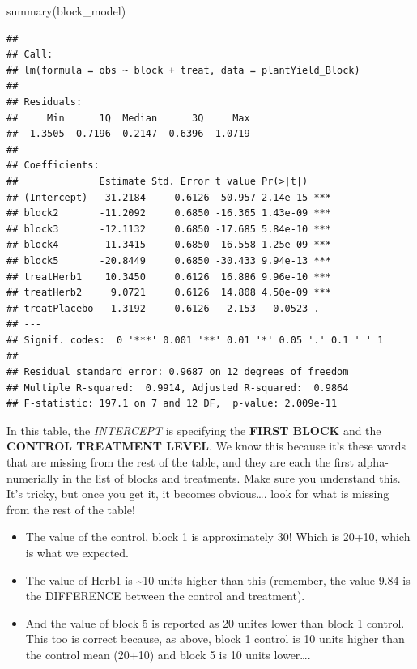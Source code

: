 \documentclass[
]{book}
\newenvironment{Shaded}{\begin{snugshade}}{\end{snugshade}}
\newcommand{\FunctionTok}[1]{\textcolor[rgb]{0.00,0.00,0.00}{#1}}
\newcommand{\NormalTok}[1]{#1}
\providecommand{\tightlist}{%
  \setlength{\itemsep}{0pt}\setlength{\parskip}{0pt}}
\begin{document}
\begin{Shaded}
\begin{Highlighting}[]
\FunctionTok{summary}\NormalTok{(block\_model)}
\end{Highlighting}
\end{Shaded}

\begin{verbatim}
## 
## Call:
## lm(formula = obs ~ block + treat, data = plantYield_Block)
## 
## Residuals:
##     Min      1Q  Median      3Q     Max 
## -1.3505 -0.7196  0.2147  0.6396  1.0719 
## 
## Coefficients:
##              Estimate Std. Error t value Pr(>|t|)    
## (Intercept)   31.2184     0.6126  50.957 2.14e-15 ***
## block2       -11.2092     0.6850 -16.365 1.43e-09 ***
## block3       -12.1132     0.6850 -17.685 5.84e-10 ***
## block4       -11.3415     0.6850 -16.558 1.25e-09 ***
## block5       -20.8449     0.6850 -30.433 9.94e-13 ***
## treatHerb1    10.3450     0.6126  16.886 9.96e-10 ***
## treatHerb2     9.0721     0.6126  14.808 4.50e-09 ***
## treatPlacebo   1.3192     0.6126   2.153   0.0523 .  
## ---
## Signif. codes:  0 '***' 0.001 '**' 0.01 '*' 0.05 '.' 0.1 ' ' 1
## 
## Residual standard error: 0.9687 on 12 degrees of freedom
## Multiple R-squared:  0.9914, Adjusted R-squared:  0.9864 
## F-statistic: 197.1 on 7 and 12 DF,  p-value: 2.009e-11
\end{verbatim}

In this table, the \emph{INTERCEPT} is specifying the \textbf{FIRST BLOCK} and the \textbf{CONTROL TREATMENT LEVEL}. We know this because it's these words that are missing from the rest of the table, and they are each the first alpha-numerially in the list of blocks and treatments. Make sure you understand this. It's tricky, but once you get it, it becomes obvious\ldots. look for what is missing from the rest of the table!

\begin{itemize}
\tightlist
\item
  The value of the control, block 1 is approximately 30! Which is 20+10, which is what we expected.
\item
  The value of Herb1 is \textasciitilde10 units higher than this (remember, the value 9.84 is the DIFFERENCE between the control and treatment).
\item
  And the value of block 5 is reported as 20 unites lower than block 1 control. This too is correct because, as above, block 1 control is 10 units higher than the control mean (20+10) and block 5 is 10 units lower\ldots.
\end{itemize}
\end{document}
